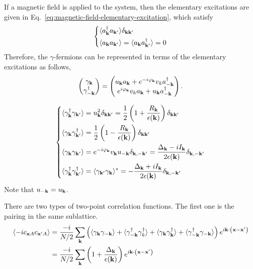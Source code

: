 If a magnetic field is applied to the system, then the elementary excitations are given in Eq.~\eqref{eq:magnetic-field-elementary-excitation}, which satisfy 
\[
\left\{
\begin{aligned}
    & \langle a^{\dagger}_{\mathbf{k}} a_{\mathbf{k}'} \rangle 
    \delta_{\mathbf{k}\mathbf{k}'} \\
    & \langle a_{\mathbf{k}} a_{\mathbf{k}'} \rangle = \langle a_{\mathbf{k}} a^{\dagger}_{\mathbf{k}'} \rangle = 0
\end{aligned}
\right.
\]
Therefore, the $\gamma$-fermions can be represented in terms of the elementary excitations as follows,
\[
\begin{pmatrix}
    \gamma_{\mathbf{k}} \\
    \gamma^\dagger_{-\mathbf{k}} 
\end{pmatrix} 
=
\begin{pmatrix}
    u_{\mathbf{k}} a_{\mathbf{k}} + e^{-i\varphi_{\mathbf{k}}} v_k a_{-\mathbf{k}}^\dagger \\
    e^{i\varphi_{\mathbf{k}}} v_k a_{\mathbf{k}} + u_{\mathbf{k}} a_{-\mathbf{k}}^\dagger
\end{pmatrix}.
\]

\[
\left\{
\begin{aligned}
    & \langle \gamma_{\mathbf{k}}^\dagger \gamma_{\mathbf{k}'} \rangle
    =
    u_{\mathbf{k}}^2 \delta_{\mathbf{k}\mathbf{k}'} 
    =
    \frac{1}{2}\left( 1 + \frac{R_{\mathbf{k}}}{\epsilon(\mathbf{k})}  \right) \delta_{\mathbf{k}\mathbf{k}'} 
    \\
    & \langle \gamma_{\mathbf{k}} \gamma_{\mathbf{k}'}^\dagger \rangle 
    = 
    \frac{1}{2}\left( 1 - \frac{R_{\mathbf{k}}}{\epsilon(\mathbf{k})}  \right) \delta_{\mathbf{k}\mathbf{k}'} \\
    & \langle \gamma_{\mathbf{k}} \gamma_{\mathbf{k}'} \rangle = e^{-i\varphi_{\mathbf{k}}} v_{\mathbf{k}} u_{-\mathbf{k}} \delta_{\mathbf{k},-\mathbf{k}'}
    =
    \frac{\Delta_{\mathbf{k}} - iI_{\mathbf{k}} }{2\epsilon(\mathbf{k})} \delta_{\mathbf{k},-\mathbf{k}'} \\
    & \langle \gamma^\dagger_{\mathbf{k}} \gamma^\dagger_{\mathbf{k}'} \rangle = \langle \gamma_{\mathbf{k}'} \gamma_{\mathbf{k}} \rangle^* = 
    -\frac{\Delta_{\mathbf{k}} + iI_{\mathbf{k}} }{2\epsilon(\mathbf{k})} \delta_{\mathbf{k},-\mathbf{k}'}
\end{aligned}
\right.
\]
Note that $u_{-\mathbf{k}} = u_{\mathbf{k}}$.

There are two types of two-point correlation functions. The first one is the pairing in the same sublattice.
\begin{align*}
  \langle -ic_{\mathbf{x}A}c_{\mathbf{x}'A} \rangle 
  &= 
  \frac{-i}{N/2}
  \sum_{\mathbf{k}}\left(  \langle \gamma_{\mathbf{k}}\gamma_{-\mathbf{k}} \rangle + \langle \gamma_{-\mathbf{k}}^\dagger\gamma^\dagger_{k} \rangle +
  \langle \gamma_{\mathbf{k}}\gamma_{\mathbf{k}}^\dagger \rangle + 
  \langle \gamma_{-\mathbf{k}}^\dagger\gamma_{-\mathbf{k}} \rangle
   \right) e^{i\mathbf{k}\cdot\left( \mathbf{x}-\mathbf{x'} \right)} \\
  &= 
  \frac{-i}{N/2}
  \sum_{\mathbf{k}}
  \left( 
    1 + \frac{\Delta_{\mathbf{k}}}{\epsilon(\mathbf{k})}
   \right) e^{i\mathbf{k}\cdot\left( \mathbf{x}-\mathbf{x'} \right)}
\end{align*}

